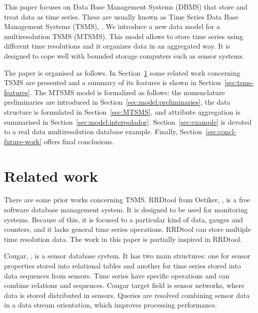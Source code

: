 
This paper focuses on Data Base Management Systems (DBMS) that store
and treat data as time series. These are usually known as Time Series
Data Base Management Systems (TSMS), \cite{dreyer94}.  We introduce a
new data model for a multiresolution TSMS (MTSMS). This model allows
to store time series using different time resolutions and it organizes
data in an aggregated way. It is designed to cope well with bounded
storage computers such as sensor systems.

The paper is organised as follows.  In Section~\ref{sec:related-work}
some related work concerning TSMS are presented and a summary of its
features is shown in Section~\ref{sec:tsms-features}.  The MTSMS model
is formalized as follows: the nomenclature preliminaries are
introduced in Section~\ref{sec:model:preliminaries}, the data
structure is formulated in Section~\ref{sec:MTSMS}, and attribute
aggregation is summarised in
Section~\ref{sec:model:interpolador}. Section~\ref{sec:example} is
devoted to a real data multiresolution database example. Finally,
Section~\ref{sec:concl-future-work} offers final
conclusions.%



\section{Related work}
\label{sec:related-work}

There are some prior works concerning TSMS. 
%
RRDtool from Oetiker, \cite{rrdtool}, is a free software database
management system. It is designed to be used for monitoring
systems. Because of this, it is focused to a particular kind of data,
gauges and counters, and it lacks general time series
operations. RRDtool can store multiple time resolution data. The work
in this paper is partially inspired in RRDtool.

Cougar, \cite{bonnet01}, is a sensor database system. It has two main
structures: one for sensor properties stored into relational tables
and another for time series stored into data sequences from
sensors. Time series have specific operations and can combine
relations and sequences. Cougar target field is sensor networks, where
data is stored distributed in sensors. Queries are resolved combining
sensor data in a data stream orientation, which improves processing
performance.

